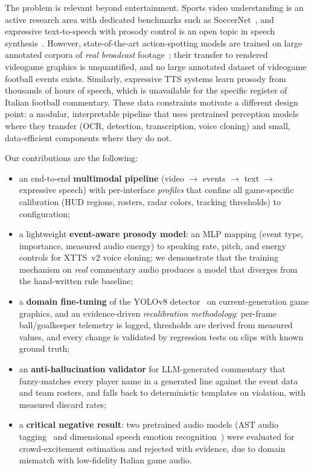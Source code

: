 \documentclass[10pt,twocolumn,a4paper]{article}
\begin{document}
	The problem is relevant beyond entertainment. Sports video understanding is an active research area with dedicated benchmarks such as SoccerNet~\cite{giancola2018soccernet,deliege2021soccernetv2}, and expressive text-to-speech with prosody control is an open topic in speech synthesis~\cite{casanova2024xtts}. However, state-of-the-art action-spotting models are trained on large annotated corpora of \emph{real broadcast} footage~\cite{cioppa2025soccernet}; their transfer to rendered videogame graphics is unquantified, and no large annotated dataset of videogame football events exists. Similarly, expressive TTS systems learn prosody from thousands of hours of speech, which is unavailable for the specific register of Italian football commentary. These data constraints motivate a different design point: a modular, interpretable pipeline that uses pretrained perception models where they transfer (OCR, detection, transcription, voice cloning) and small, data-efficient components where they do not.

	Our contributions are the following:
	\begin{itemize}
		\item an end-to-end \textbf{multimodal pipeline} (video $\rightarrow$ events $\rightarrow$ text $\rightarrow$ expressive speech) with per-interface \emph{profiles} that confine all game-specific calibration (HUD regions, rosters, radar colors, tracking thresholds) to configuration;
		\item a lightweight \textbf{event-aware prosody model}: an MLP mapping (event type, importance, measured audio energy) to speaking rate, pitch, and energy controls for XTTS~v2 voice cloning; we demonstrate that the training mechanism on \emph{real} commentary audio produces a model that diverges from the hand-written rule baseline;
		\item a \textbf{domain fine-tuning} of the YOLOv8 detector~\cite{jocher2023ultralytics} on current-generation game graphics, and an evidence-driven \emph{recalibration methodology}: per-frame ball/goalkeeper telemetry is logged, thresholds are derived from measured values, and every change is validated by regression tests on clips with known ground truth;
		\item an \textbf{anti-hallucination validator} for LLM-generated commentary that fuzzy-matches every player name in a generated line against the event data and team rosters, and falls back to deterministic templates on violation, with measured discard rates;
		\item a \textbf{critical negative result}: two pretrained audio models (AST audio tagging~\cite{gong2021ast} and dimensional speech emotion recognition~\cite{wagner2023dawn}) were evaluated for crowd-excitement estimation and rejected with evidence, due to domain mismatch with low-fidelity Italian game audio.
	\end{itemize}
\end{document}
